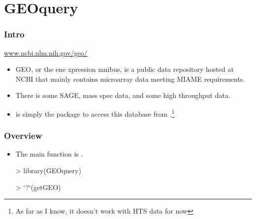 \section{GEOquery}

\begin{frame}[allowframebreaks]
  \frametitle{Intro}
  \url{www.ncbi.nlm.nih.gov/geo/}
  \begin{itemize}
  \item \alert{GEO}, or the ene xpression mnibus, is a public data repository hosted at NCBI that mainly contains microarray data meeting MIAME requirements.
  \item There is some SAGE, mass spec data, and some high throughput data.
  \item {} is simply the package to access this database from .\footnote{As far as I know, it doesn't work with HTS data for now}
  \end{itemize}
\end{frame}

\begin{frame}
  \frametitle{Overview}
  \begin{itemize}
  \item The main function is .
\begin{Schunk}
\begin{Sinput}
> library(GEOquery)
\end{Sinput}
\end{Schunk}
\begin{Schunk}
\begin{Sinput}
> `?`(getGEO)
\end{Sinput}
\end{Schunk}
  \end{itemize}
\end{frame}


